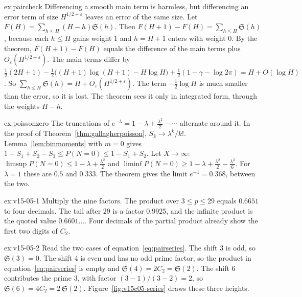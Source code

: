 \begin{solution}{ex:paircheck}
\idea Differencing a smooth main term is harmless, but differencing an error term of size $H^{1/2+\varepsilon}$ leaves an error of the same size.
\writeup Let $F(H)=\sum_{h\le H}(H-h)\mathfrak S(h)$. Then $F(H+1)-F(H)=\sum_{h\le H}\mathfrak S(h)$, because each $h\le H$ gains weight $1$ and $h=H+1$ enters with weight $0$. By the theorem, $F(H+1)-F(H)$ equals the difference of the main terms plus $O_\varepsilon(H^{1/2+\varepsilon})$. The main terms differ by $\frac12(2H+1)-\frac12\bigl((H+1)\log(H+1)-H\log H\bigr)+\frac12(1-\gamma-\log2\pi)=H+O(\log H)$. So $\sum_{h\le H}\mathfrak S(h)=H+O_\varepsilon(H^{1/2+\varepsilon})$. The term $-\frac12\log H$ is much smaller than the error, so it is lost. The theorem sees it only in integrated form, through the weights $H-h$.
\end{solution}

\begin{solution}{ex:poissonzero}
\idea The truncations of $e^{-\lambda}=1-\lambda+\frac{\lambda^2}2-\cdots$ alternate around it.
\writeup In the proof of Theorem~\ref{thm:gallagherpoisson}, $S_k\to\lambda^k/k!$. Lemma~\ref{lem:binmoments} with $m=0$ gives $1-S_1+S_2-S_3\le P(N=0)\le1-S_1+S_2$. Let $X\to\infty$: $\limsup P(N=0)\le1-\lambda+\frac{\lambda^2}2$ and $\liminf P(N=0)\ge1-\lambda+\frac{\lambda^2}2-\frac{\lambda^3}6$. For $\lambda=1$ these are $0.5$ and $0.333$. The theorem gives the limit $e^{-1}=0.368$, between the two.
\end{solution}

\begin{solution}{ex:v15-05-1}
\idea Multiply the nine factors.
\writeup The product over \(3\le p\le29\) equals \(0.6651\) to four decimals. The tail after \(29\) is a factor \(0.9925\), and the infinite product is the quoted value \(0.6601\ldots\). Four decimals of the partial product already show the first two digits of \(C_2\).
\end{solution}

\begin{solution}{ex:v15-05-2}
\idea Read the two cases of equation~\eqref{eq:pairseries}.
\writeup The shift \(3\) is odd, so \(\mathfrak S(3)=0\). The shift \(4\) is even and has no odd prime factor, so the product in equation~\eqref{eq:pairseries} is empty and \(\mathfrak S(4)=2C_2=\mathfrak S(2)\). The shift \(6\) contributes the prime \(3\), with factor \((3-1)/(3-2)=2\), so \(\mathfrak S(6)=4C_2=2\,\mathfrak S(2)\). Figure~\ref{fig:v15c05-series} draws these three heights.
\end{solution}

